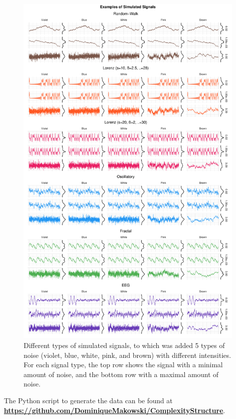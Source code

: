\documentclass[
  man]{apa6}
\begin{document}
\begin{figure}
\centering
\includegraphics{./figures/signals-1.pdf}
\caption{\label{fig:signals}Different types of simulated signals, to which was added 5 types of noise (violet, blue, white, pink, and brown) with different intensities. For each signal type, the top row shows the signal with a minimal amount of noise, and the bottom row with a maximal amount of noise.}
\end{figure}

The Python script to generate the data can be found at \textbf{\url{https://github.com/DominiqueMakowski/ComplexityStructure}}.
\end{document}
